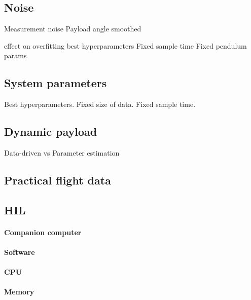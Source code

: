     \subsection{Noise}
        Measurement noise 
        Payload angle smoothed

        effect on overfitting
        best hyperparameters
        Fixed sample time
        Fixed pendulum params
    
    \subsection{System parameters}
        Best hyperparameters.
        Fixed size of data.
        Fixed sample time.

    \subsection{Dynamic payload}
        Data-driven vs Parameter estimation

    \subsection{Practical flight data}
    \subsection{HIL}
        \paragraph{Companion computer}
        \paragraph{Software}
        \paragraph{CPU}
        \paragraph{Memory}

